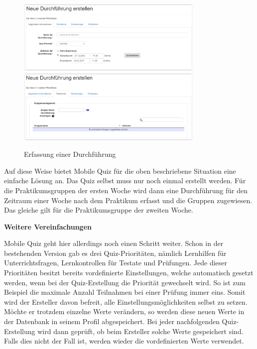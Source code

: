 \begin{figure}[H]
	\centering
	\includegraphics[width=0.8\textwidth]{Images/Quiz_Durchfuehrung1.PNG}
	\includegraphics[width=0.8\textwidth]{Images/Quiz_Durchfuehrung2.PNG}
	\caption{Erfassung einer Durchführung}
\end{figure}


Auf diese Weise bietet Mobile Quiz für die oben beschriebene Situation eine einfache Lösung an. Das Quiz selbst muss nur noch einmal erstellt werden. Für die Praktikumsgruppen der ersten Woche wird dann eine Durchführung für den Zeitraum einer Woche nach dem Praktikum erfasst und die Gruppen zugewiesen. Das gleiche gilt für die Praktikumsgruppe der zweiten Woche. \\

\bigskip\bigskip

\textbf{Weitere Vereinfachungen}
\bigskip

Mobile Quiz geht hier allerdings noch einen Schritt weiter. Schon in der bestehenden Version gab es drei Quiz-Prioritäten, nämlich Lernhilfen für Unterrichtsfragen, Lernkontrollen für Testate und Prüfungen. Jede dieser Prioritäten besitzt bereits vordefinierte Einstellungen, welche automatisch gesetzt werden, wenn bei der Quiz-Erstellung die Priorität gewechselt wird. So ist zum Beispiel die maximale Anzahl Teilnahmen bei einer Prüfung immer eins. Somit wird der Ersteller davon befreit, alle Einstellungsmöglichkeiten selbst zu setzen. Möchte er trotzdem einzelne Werte verändern, so werden diese neuen Werte in der Datenbank in seinem Profil abgespeichert. Bei jeder nachfolgenden Quiz-Erstellung wird dann geprüft, ob beim Ersteller solche Werte gespeichert sind. Falls dies nicht der Fall ist, werden wieder die vordefinierten Werte verwendet. 

